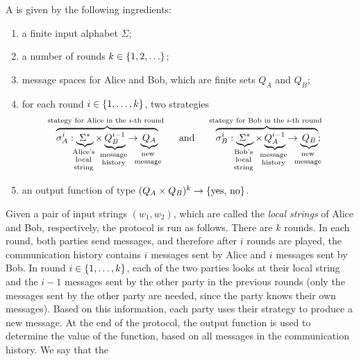 \begin{definition}
    \label{def:two-party-protocol-boolean}
   A 
   is given by the following ingredients: 
  \begin{enumerate}
    \item a finite input alphabet $\Sigma$;
    \item a number of rounds $k \in \{1,2,\ldots\}$;
    \item message spaces for Alice and Bob, which are finite sets $Q_A$ and $Q_B$;
    \item for each round $i \in \{1,\ldots,k\}$, two strategies
    \begin{align*}
    \myoverbrace{\sigma_A^i : \myunderbrace{\Sigma^*}{Alice's \\ local\\ string} \times \myunderbrace{Q_B^{i-1}}{message \\ history}  \to \myunderbrace{Q_A}{new\\ message}}{stategy for Alice in the $i$-th round}
    \qquad \text{and} \qquad 
        \myoverbrace{\sigma_B^i : \myunderbrace{\Sigma^*}{Bob's \\ local\\ string} \times \myunderbrace{Q_A^{i-1}}{message \\ history}  \to \myunderbrace{Q_B}{new\\ message}}{stategy for Bob in the $i$-th round};
    \end{align*}
    \item an output function of type $(Q_A \times Q_B)^{k} \to \{\text{yes, no}\}$.
  \end{enumerate}
\end{definition}
\AP
Given a pair of input strings $(w_1,w_2)$, which are called the \emph{local
strings} of Alice and Bob, respectively, the  protocol is run as follows. There
are $k$ rounds. In each round, both parties send messages, and therefore after
$i$ rounds are played, the communication history contains $i$ messages sent by
Alice and $i$ messages sent by Bob.  In round  $i \in \{1,\ldots,k\}$,  each
of the two parties  looks at their local string and the $i-1$ messages sent by
the other party in the previous rounds (only the messages sent by the other
party are needed, since the party knows their own messages). Based on this
information, each party uses their strategy to produce a new message. At the
end of the protocol, the output function is used to determine the value of the
function, based on all messages in  the communication history. We say that the
